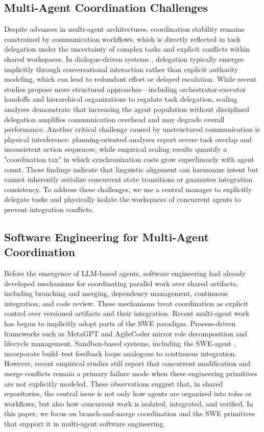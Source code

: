 \subsection{Multi-Agent Coordination Challenges}
Despite advances in multi-agent architectures, coordination stability remains constrained by communication workflows, which is directly reflected in task delegation under the uncertainty of complex tasks and explicit conflicts within shared workspaces. In dialogue-driven systems \citep{wu2024autogen}, delegation typically emerges implicitly through conversational interaction rather than explicit authority modeling, which can lead to redundant effort or delayed escalation. While recent studies propose more structured approaches—including orchestrator-executor handoffs and hierarchical organizations \citep{song2025coact, xu2025boad} to regulate task delegation, scaling analyses \citep{qian2024scaling, li2024more} demonstrate that increasing the agent population without disciplined delegation amplifies communication overhead and may degrade overall performance. Another critical challenge caused by unstructured communication is physical interference: planning-oriented analyses \citep{li2024agent} report severe task overlap and inconsistent action sequences, while empirical scaling results \citep{qian2024scaling, li2024more} quantify a "coordination tax" in which synchronization costs grow superlinearly with agent count. These findings indicate that linguistic alignment can harmonize intent but cannot inherently serialize concurrent state transitions or guarantee integration consistency. To address these challenges, we use a central manager to explicitly delegate tasks and physically isolate the workspaces of concurrent agents to prevent integration conflicts.

\subsection{Software Engineering for Multi-Agent Coordination}
Before the emergence of LLM-based agents, software engineering had already developed mechanisms for coordinating parallel work over shared artifacts, including branching and merging, dependency management, continuous integration, and code review. These mechanisms treat coordination as explicit control over versioned artifacts and their integration. Recent multi-agent work has begun to implicitly adopt parts of the SWE paradigm. Process-driven frameworks such as MetaGPT \citep{hong2023metagpt} and AgileCoder \citep{nguyen2025agilecoder} mirror role decomposition and lifecycle management. Sandbox-based systems, including the SWE-agent \cite{yang2024swe}, incorporate build–test feedback loops analogous to continuous integration. However, recent empirical studies \cite{khatua2026cooperbench} still report that concurrent modification and merge conflicts remain a primary failure mode when these engineering primitives are not explicitly modeled. These observations suggest that, in shared repositories, the central issue is not only how agents are organized into roles or workflows, but also how concurrent work is isolated, integrated, and verified.  In this paper, we focus on branch-and-merge coordination and the SWE primitives that support it in multi-agent software engineering.

